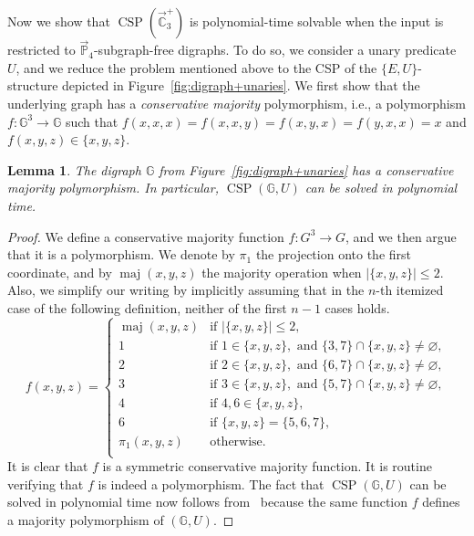 \documentclass{article}
\newtheorem{lemma}[theorem]{Lemma}
\theoremstyle{definition}
\theoremstyle{remark}
\DeclareMathOperator{\maj}{maj}
\DeclareMathOperator{\CSP}{CSP}
\newcommand{\bC}{{\mathbb C}}
\newcommand{\bG}{{\mathbb G}}
\newcommand{\bP}{{\mathbb P}}
\begin{document}
Now we show that $\CSP(\vec{\bC}_3^+)$ is polynomial-time solvable when the input is restricted
to $\vec{\bP}_4$-subgraph-free digraphs. To do so, we consider a unary predicate $U$, and we
reduce the problem mentioned above to the CSP of the $\{E,U\}$-structure depicted  in 
Figure~\ref{fig:digraph+unaries}. We first show that the underlying graph has a \emph{conservative
majority} polymorphism, i.e., a polymorphism $f\colon \bG^3\to \bG$ such that $f(x,x,x) = f(x,x,y) = f(x,y,x) = f(y,x,x) = x$
and $f(x,y,z)\in \{x,y,z\}$.

\begin{lemma}\label{lem:conservative-majority}
    The digraph $\bG$ from Figure~\ref{fig:digraph+unaries} has a conservative majority polymorphism. 
    In particular, $\CSP(\bG,U)$ can be solved in polynomial time.
\end{lemma}
\begin{proof}  
    We define a conservative majority function $f\colon G^3\to G$, and we then argue that it is
    a polymorphism. We denote by $\pi_1$ the projection onto the first coordinate, and by
    $\maj(x,y,z)$ the majority operation when $|\{x,y,z\}|\le 2$. Also, we simplify our writing
    by implicitly assuming that in the $n$-th itemized case of the following definition, neither
    of the first $n-1$ cases holds.
    \begin{equation*}
        f(x,y,z)=
            \begin{cases}
                \maj(x,y,z) & \text{if } |\{x,y,z\}| \le 2,\\
                1 & \text{if }   1\in \{x,y,z\}, \text{ and } \{3,7\}\cap \{x,y,z\}\neq\varnothing,\\
                2 & \text{if }   2\in \{x,y,z\}, \text{ and } \{6,7\}\cap \{x,y,z\}\neq\varnothing,\\
                3 & \text{if }   3\in \{x,y,z\},  \text{ and } \{5,7\}\cap\{x,y,z\}\neq\varnothing,\\
                4 & \text{if }   4,6\in \{x,y,z\},\\
                6 & \text{if } \{x,y,z\} = \{5,6,7\},\\
                \pi_1(x,y,z) & \text{otherwise.}\\
    \end{cases}
\end{equation*}
    It is clear that $f$ is a symmetric conservative majority function. It is routine  verifying that
    $f$ is indeed a polymorphism.
    The fact that $\CSP(\bG,U)$ can be solved in polynomial time now follows from~\cite{DalmauKrokhin08} because the same function $f$ defines a majority polymorphism of $(\bG,U)$. 
\end{proof}
\end{document}
